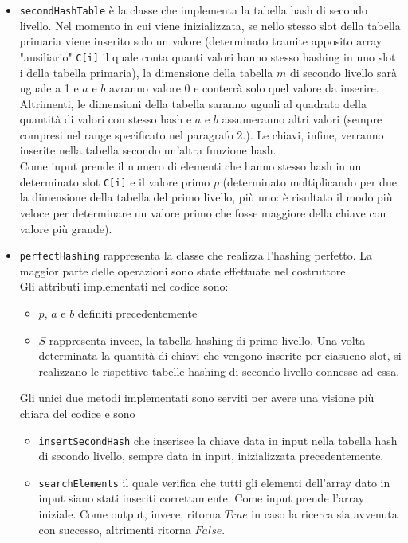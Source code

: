 \documentclass[]{article}
\begin{document}
\begin{itemize}
    \item \texttt{secondHashTable} è la classe che implementa la tabella hash di secondo livello. 
        Nel momento in cui viene inizializzata, se nello stesso slot della tabella primaria viene inserito solo un valore (determinato tramite apposito array "ausiliario" \texttt{C[i]} 
        il quale conta quanti valori hanno stesso hashing in uno slot i della tabella primaria), 
        la dimensione della tabella $m$ di secondo livello sarà uguale a 1 e $a$ e $b$ avranno valore 0 e conterrà solo quel valore da inserire. 
        Altrimenti, le dimensioni della tabella saranno uguali al quadrato della quantità di valori con stesso hash e
        $a$ e $b$ assumeranno altri valori (sempre compresi nel range specificato nel paragrafo 2.). 
        Le chiavi, infine, verranno inserite nella tabella secondo un'altra funzione hash.\\
        Come input prende il numero di elementi che hanno stesso hash in un determinato slot \texttt{C[i]} e il valore primo $p$ 
        (determinato moltiplicando per due la dimensione della tabella del primo livello, più uno: 
        è risultato il modo più veloce per determinare un valore primo che fosse maggiore della chiave con valore più grande).
    \item \texttt{perfectHashing} rappresenta la classe che realizza l'hashing perfetto. La maggior parte delle operazioni sono state
        effettuate nel costruttore.\\
        Gli attributi implementati nel codice sono:
        \begin{itemize}
            \item $p$, $a$ e $b$ definiti precedentemente
            \item $S$ rappresenta invece, la tabella hashing di primo livello. Una volta determinata la quantità di chiavi che vengono inserite per ciasucno slot, 
                si realizzano le rispettive tabelle hashing di secondo livello connesse ad essa.
        \end{itemize}    
        Gli unici due metodi implementati sono serviti per avere una visione più chiara del codice e sono
        \begin{itemize}
            \item \texttt{insertSecondHash} che inserisce la chiave data in input nella tabella hash di secondo livello, 
                sempre data in input, inizializzata precedentemente.
            \item \texttt{searchElements} il quale verifica che tutti gli elementi dell'array dato in input siano stati inseriti correttamente. 
                Come input prende l'array iniziale. Come output, invece, ritorna $True$ in caso la ricerca sia avvenuta con successo, altrimenti ritorna $False$.
        \end{itemize}            
\end{itemize}
\end{document}
